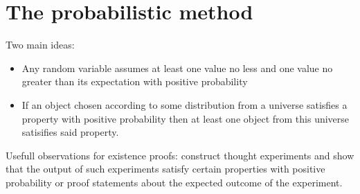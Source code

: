 \section*{The probabilistic method}
Two main ideas:
\begin{itemize}
	\item Any random variable assumes at least one value no less and one value no greater
		than its expectation with positive probability
	\item If an object chosen according to some distribution from a universe satisfies a property with positive probability
		then at least one object from this universe satisifies said property.
\end{itemize}
Usefull observations for existence proofs: 
construct thought experiments and show that the output of such experiments satisfy certain properties with positive probability
or proof statements about the expected outcome of the experiment.
